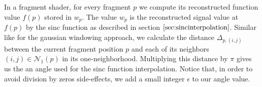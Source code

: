 In a fragment shader, for every fragment $p$ we compute its reconstructed function value $f(p)$ stored in $w_p$. The value $w_p$ is the reconstructed signal value at $f(p)$ by the sinc function as described in section $\ref{sec:sincinterpolation}$.
Similar like for the gaussian windowing approach, we calculate the distance $\Delta_{p,(i,j)}$ between the current fragment position $p$ and each of its neighbors $(i,j) \in \mathcal{N}_{1}(p)$ in its one-neighborhood. Multiplying this distance by $\pi$ gives us the an angle used for the sinc function interpolation. Notice that, in order to avoid division by zeros side-effects, we add a small integer $\epsilon$ to our angle value.

